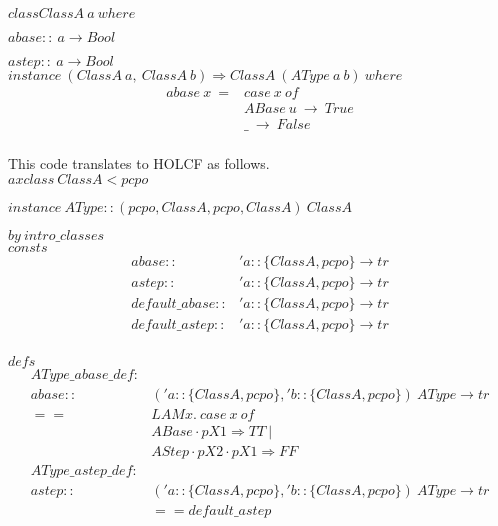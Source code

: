 \documentclass[a4paper,12pt]{article}
\begin{document}
\noindent $class ClassA \ a \ where$

$abase :: \ a \to Bool $
 
$ astep :: \ a \to Bool $\\

\noindent $instance \ (ClassA \ a, \ ClassA \ b) \Rightarrow ClassA \ (AType \ a \ b) \ where $
$$\begin{array}{ll}
abase \ x \ = & case \ x \ of \\
           &  ABase \ u \ \to \ True \\
            & \_ \ \to \ False \\
\end{array}$$

\noindent This code translates to HOLCF as follows.\\

\noindent $axclass \ ClassA < pcpo$

\noindent $instance \ AType::({pcpo, ClassA}, {pcpo, ClassA}) \ ClassA$ 

$by \ intro\_classes$\\

\noindent $consts$
$$\begin{array}{ll}
abase :: & 'a::\{ClassA, pcpo\} \to tr \\
astep :: & 'a::\{ClassA, pcpo\} \to tr \\
default\_abase :: & 'a::\{ClassA, pcpo\} \to tr \\
default\_astep :: & 'a::\{ClassA, pcpo\} \to tr \\
\end{array}$$

\noindent $defs$
$$\begin{array}{rl}
AType\_abase\_def : & \\
 abase :: & ('a::\{ClassA, pcpo\}, 'b::\{ClassA, pcpo\}) \ AType \to tr \\
                                   == & LAM x. \ case \ x \ of \\
                                  &  ABase \cdot pX1 \Rightarrow TT \ | \\
                                  &  AStep \cdot pX2 \cdot pX1 \Rightarrow FF \\
AType\_astep\_def : & \\
   astep :: & ('a::\{ClassA, pcpo\}, 'b::\{ClassA, pcpo\}) \ AType \to tr \\
                         & == default\_astep \\
\end{array}$$ 
\end{document}
